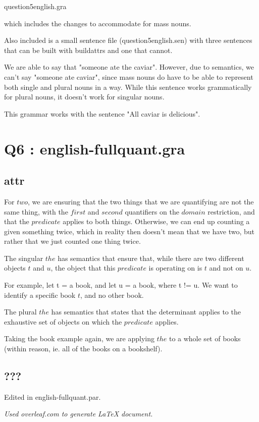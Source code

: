 \documentclass[12pt, letterpaper]{article}
\begin{document}
question5english.gra

which includes the changes to accommodate for mass nouns.

Also included is a small sentence file (question5english.sen) with three sentences that can be built with buildattrs and one that cannot. 

We are able to say that "someone ate the caviar". However, due to semantics, we can't say "someone ate caviar", since mass nouns do have to be able to represent both single and plural nouns in a way. While this sentence works grammatically for plural nouns, it doesn't work for singular nouns. 

This grammar works with the sentence "All caviar is delicious".

\section{Q6 : english-fullquant.gra}
\subsection{attr}


For $two$, we are ensuring that the two things that we are quantifying are not the same thing, with the $first$ and $second$ quantifiers on the $domain$ restriction, and that the $predicate$ applies to both things. Otherwise, we can end up counting a given something twice, which in reality then doesn't mean that we have two, but rather that we just counted one thing twice. 


The singular $the$ has semantics that ensure that, while there are two different objects $t$ and $u$, the object that this $predicate$ is operating on is $t$ and not on $u$. 

For example, let t = a book, and let u = a book, where t != u. We want to identify a specific book $t$, and no other book. 


The plural $the$ has semantics that states that the determinant applies to the exhaustive set of objects on which the $predicate$ applies.

Taking the book example again, we are applying $the$ to a whole set of books (within reason, ie. all of the books on a bookshelf). 

\subsection{???}
Edited in english-fullquant.par.

\begin{center}
\textit{Used overleaf.com to generate LaTeX document.}
\end{center}
\end{document}

